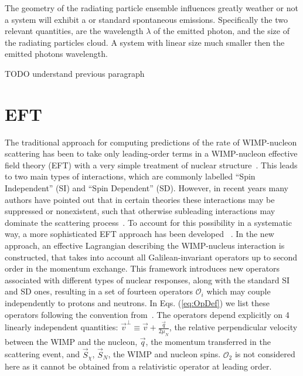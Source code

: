 The geometry of the radiating particle ensemble influences greatly weather or not a system will exhibit a \superradiance or standard spontaneous emissions. Specifically the two relevant quantities, are the wavelength $\lambda$ of the emitted photon, and the size of the radiating particles cloud. A system with linear size much smaller then the emitted photons wavelength.   

TODO understand previous paragraph

\section{EFT}
\label{sec:intro_EFT}

The traditional approach for computing predictions of the rate of WIMP-nucleon scattering has been to take only leading-order terms in a WIMP-nucleon effective field theory (EFT) with a very simple treatment of nuclear structure~\cite{LEWIN}. This leads to two main types of interactions, which are commonly labelled ``Spin Independent'' (SI) and ``Spin Dependent'' (SD). However, in recent years many authors have pointed out that in certain theories these interactions may be suppressed or nonexistent, such that otherwise subleading interactions may dominate the scattering process~\cite{Chang:2009yt}. To account for this possibility in a systematic way, a more sophisticated EFT approach has been developed ~\cite{Fitzpatrick:2012ib,Anand:MathTools,Fitzpatrick:MathTools}. In the new approach, an effective Lagrangian describing the WIMP-nucleus interaction is constructed, that takes into account all Galilean-invariant operators up to second order in the momentum exchange. This framework introduces new operators associated with different types of nuclear responses, along with the standard SI and SD ones, resulting in a set of fourteen operators $\mathcal{O}_i$ which may couple independently to protons and neutrons. In Eqs. (\ref{eq:OpDef}) we list these operators following the convention from~\cite{Anand:MathTools}. The operators depend explicitly on 4 linearly independent quantities: $\vec{v}^{\perp} \equiv \vec{v} + \frac{\vec{q}}{2\mu_N} $, the relative perpendicular velocity between the WIMP and the nucleon, $\vec{q}$, the momentum transferred in the scattering event, and $\vec{S}_\chi$, $\vec{S}_N$, the WIMP and nucleon spins. $\mathcal{O}_2$ is not considered here as it cannot be obtained from a relativistic operator at leading order.
%

